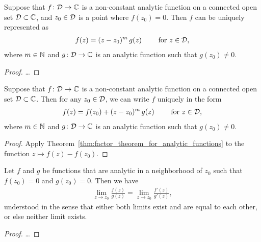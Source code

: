 \begin{theorem}
  \label{thm:factor_theorem_for_analytic_functions}
  Suppose that $f \colon \mathcal{D} \to \mathbb{C}$ is a non-constant analytic function
  on a connected open set $\mathcal{D} \subset \mathbb{C}$, and $z_0 \in \mathcal{D}$
  is a point where $f(z_0) = 0$.
  Then $f$ can be uniquely represented as
  \begin{align*}
    f(z) = (z - z_0)^m \, g(z) \qquad \text{ for } z \in \mathcal{D} ,
  \end{align*}
  where $m \in \mathbb{N}$ and $g \colon \mathcal{D} \to \mathbb{C}$ is an analytic
  function such that $g(z_0) \ne 0$.
\end{theorem}
\begin{proof}
  \ldots
\end{proof}

\begin{corollary}
  \label{cor:analytic_local_representation}
  Suppose that $f \colon \mathcal{D} \to \mathbb{C}$ is a non-constant analytic function
  on a connected open set $\mathcal{D} \subset \mathbb{C}$.
  Then for any $z_0 \in \mathcal{D}$, we can write $f$ uniquely in the form
  \begin{align*}
    f(z) = f(z_0) + (z - z_0)^m \, g(z) \qquad \text{ for } z \in \mathcal{D} ,
  \end{align*}
  where $m \in \mathbb{N}$ and $g \colon \mathcal{D} \to \mathbb{C}$ is an analytic
  function such that $g(z_0) \ne 0$.
\end{corollary}
\begin{proof}
  Apply Theorem~\ref{thm:factor_theorem_for_analytic_functions} to the
  function $z \mapsto f(z) - f(z_0)$.
\end{proof}

\begin{theorem}
  \label{thm:l_hospital_rule}
  Let $f$ and $g$ be functions that are analytic in a neighborhood of $z_0$
  such that $f(z_0) = 0$ and $g(z_0) = 0$. Then we have
  \begin{align*}
    \lim_{z \to z_0} \frac{f(z)}{g(z)} = \lim_{z \to z_0} \frac{f'(z)}{g'(z)} ,
  \end{align*}
  understood in the sense that either both limits exist and are equal
  to each other, or else neither limit exists.
\end{theorem}
\begin{proof}
  \ldots
\end{proof}

